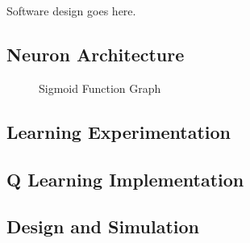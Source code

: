 Software design goes here.

\subsection{Neuron Architecture}


\begin{figure}
	\centering
	
	\caption{Sigmoid Function Graph}
\end{figure}




\subsection{Learning Experimentation}


\subsection{Q Learning Implementation}

\subsection{Design and Simulation}

